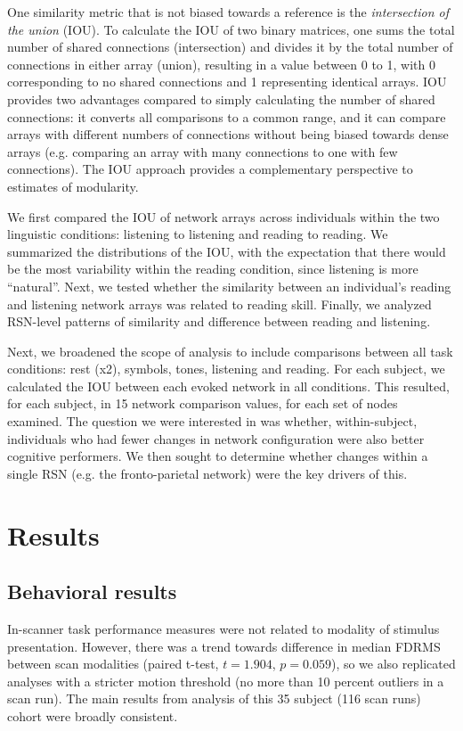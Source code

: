 One similarity metric that is not biased towards a reference is the \textit{intersection of the union} (IOU). To calculate the IOU of two binary matrices, one sums the total number of shared connections (intersection) and divides it by the total number of connections in either array (union), resulting in a value between 0 to 1, with 0 corresponding to no shared connections and 1 representing identical arrays. IOU provides two advantages compared to simply calculating the number of shared connections: it converts all comparisons to a common range, and it can compare arrays with different numbers of connections without being biased towards dense arrays (e.g. comparing an array with many connections to one with few connections). The IOU approach provides a complementary perspective to estimates of modularity.

We first compared the IOU of network arrays across individuals within the two linguistic conditions: listening to listening and reading to reading. We summarized the distributions of the IOU, with the expectation that there would be the most variability within the reading condition, since listening is more ``natural''. Next, we tested whether the similarity between an individual's reading and listening network arrays was related to reading skill. Finally, we analyzed RSN-level patterns of similarity and difference between reading and listening. 

Next, we broadened the scope of analysis to include comparisons between all task conditions: rest (x2), symbols, tones, listening and reading. For each subject, we calculated the IOU between each evoked network in all conditions. This resulted, for each subject, in 15 network comparison values, for each set of nodes examined. The question we were interested in was whether, within-subject, individuals who had fewer changes in network configuration were also better cognitive performers. We then sought to determine whether changes within a single RSN (e.g. the fronto-parietal network) were the key drivers of this. 


\section{Results}

\subsection{Behavioral results}

In-scanner task performance measures were not related to modality of stimulus presentation. However, there was a trend towards difference in median FDRMS between scan modalities (paired t-test, $t = 1.904$, $p = 0.059$), so we also replicated analyses with a stricter motion threshold (no more than 10 percent outliers in a scan run). The main results from analysis of this 35 subject (116 scan runs) cohort were broadly consistent.

